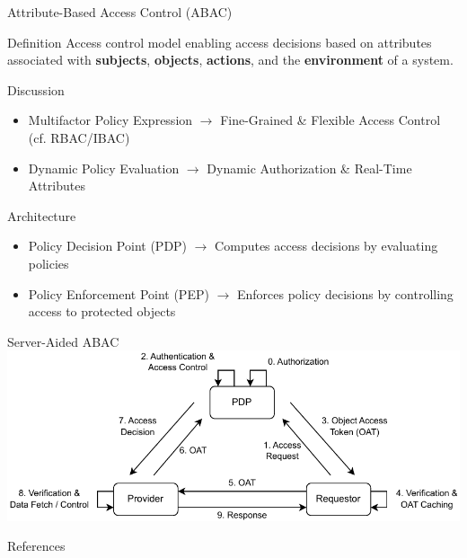 \documentclass[en]{sdqbeamer}
\begin{document}
\begin{frame}{Attribute-Based Access Control (ABAC)}
    \begin{greenblock}{Definition \parencite{JTF2020}}
        Access control model enabling access decisions based on attributes associated with \textbf{subjects}, \textbf{objects}, \textbf{actions}, and the \textbf{environment} of a system.
    \end{greenblock}

    \begin{blueblock}{Discussion \parencite{Hu2014}}
        \begin{itemize}
            \item Multifactor Policy Expression $\rightarrow$ Fine-Grained \& Flexible Access Control (cf. RBAC/IBAC)
            \item Dynamic Policy Evaluation $\rightarrow$ Dynamic Authorization \& Real-Time Attributes
        \end{itemize}
    \end{blueblock}

    \begin{grayblock}{Architecture \parencite{Hu2014,Oasis2013}}
        \begin{itemize}
            \item Policy Decision Point (PDP) $\rightarrow$ Computes access decisions by evaluating policies
            \item Policy Enforcement Point (PEP) $\rightarrow$ Enforces policy decisions by controlling access to protected objects
        \end{itemize}
    \end{grayblock}
\end{frame}
\begin{frame}{Server-Aided ABAC}
    \centering
    \includegraphics[width=1.0\textwidth]{./figures/access_control_request_delegation.drawio.pdf}
\end{frame}

\begin{frame}[allowframebreaks]{References}
\printbibliography
\end{frame}

\backupend
\end{document}
